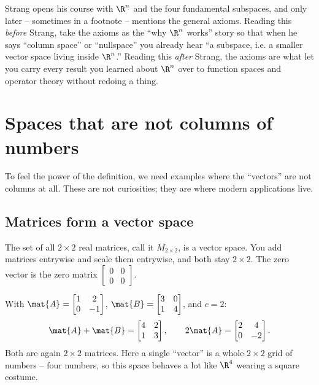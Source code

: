 \begin{strangbox}
Strang opens his course with $\R^n$ and the four fundamental subspaces, and only later --
sometimes in a footnote -- mentions the general axioms. Reading this \emph{before} Strang,
take the axioms as the ``why $\R^n$ works'' story so that when he says ``column space'' or
``nullspace'' you already hear ``a subspace, i.e. a smaller vector space living inside
$\R^n$.'' Reading this \emph{after} Strang, the axioms are what let you carry every result
you learned about $\R^n$ over to function spaces and operator theory without redoing a
thing.
\end{strangbox}

\section{Spaces that are not columns of numbers}

To feel the power of the definition, we need examples where the ``vectors'' are not
columns at all. These are not curiosities; they are where modern applications live.

\subsection{Matrices form a vector space}

The set of all $2\times 2$ real matrices, call it $M_{2\times 2}$, is a vector space. You
add matrices entrywise and scale them entrywise, and both stay $2\times 2$. The zero
vector is the zero matrix $\begin{bmatrix}0&0\\0&0\end{bmatrix}$.

\begin{example}\label{ch11:matrix-space}
With $\mat{A} = \begin{bmatrix}1&2\\0&-1\end{bmatrix}$,
$\mat{B} = \begin{bmatrix}3&0\\1&4\end{bmatrix}$, and $c = 2$:
\[
\mat{A}+\mat{B} = \begin{bmatrix}4&2\\1&3\end{bmatrix},
\qquad
2\mat{A} = \begin{bmatrix}2&4\\0&-2\end{bmatrix}.
\]
Both are again $2\times 2$ matrices. Here a single ``vector'' is a whole $2\times 2$ grid
of numbers -- four numbers, so this space behaves a lot like $\R^4$ wearing a square
costume.
\end{example}

